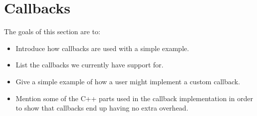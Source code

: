 \section{Callbacks}
\label{sec:callbacks}

The goals of this section are to:

\begin{itemize}
  \item Introduce how callbacks are used with a simple example.

  \item List the callbacks we currently have support for.

  \item Give a simple example of how a user might implement a custom callback.

  \item Mention some of the C++ parts used in the callback implementation in
order to show that callbacks end up having no extra overhead.
\end{itemize}
